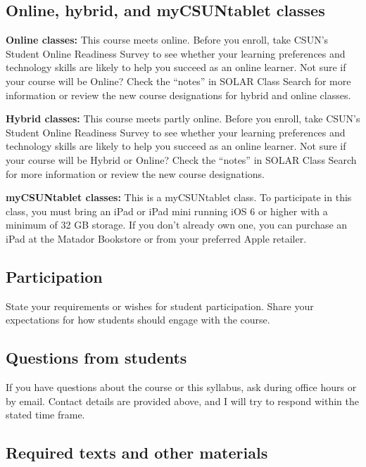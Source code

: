 \documentclass[
  letterpaper,
  DIV=11,
  numbers=noendperiod]{scrartcl}
\begin{document}
\subsection{Online, hybrid, and myCSUNtablet
classes}\label{online-hybrid-and-mycsuntablet-classes}

\textbf{Online classes:} This course meets online. Before you enroll,
take CSUN's Student Online Readiness Survey to see whether your learning
preferences and technology skills are likely to help you succeed as an
online learner. Not sure if your course will be Online? Check the
``notes'' in SOLAR Class Search for more information or review the new
course designations for hybrid and online classes.

\textbf{Hybrid classes:} This course meets partly online. Before you
enroll, take CSUN's Student Online Readiness Survey to see whether your
learning preferences and technology skills are likely to help you
succeed as an online learner. Not sure if your course will be Hybrid or
Online? Check the ``notes'' in SOLAR Class Search for more information
or review the new course designations.

\textbf{myCSUNtablet classes:} This is a myCSUNtablet class. To
participate in this class, you must bring an iPad or iPad mini running
iOS 6 or higher with a minimum of 32 GB storage. If you don't already
own one, you can purchase an iPad at the Matador Bookstore or from your
preferred Apple retailer.

\subsection{Participation}\label{participation}

State your requirements or wishes for student participation. Share your
expectations for how students should engage with the course.

\subsection{Questions from students}\label{questions-from-students}

If you have questions about the course or this syllabus, ask during
office hours or by email. Contact details are provided above, and I will
try to respond within the stated time frame.

\subsection{Required texts and other
materials}\label{required-texts-and-other-materials}
\end{document}

